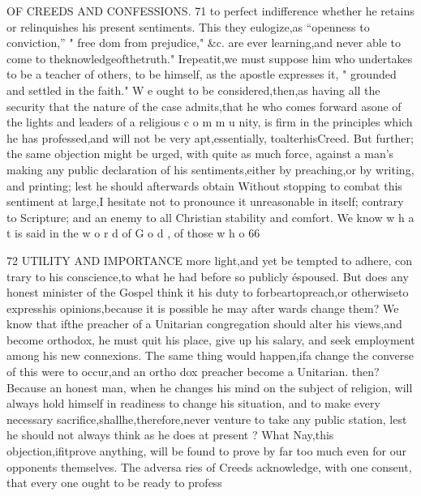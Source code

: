 \documentclass[
]{book}
\begin{document}
OF CREEDS AND CONFESSIONS. 71
to perfect indifference whether he retains or relinquishes his present sentiments. This they eulogize,as ``openness to conviction,'' " free
dom from prejudice," \&c.
are
ever learning,and never able to come to theknowledgeofthetruth." Irepeatit,we must suppose him who undertakes to be a teacher of others, to be himself, as the apostle expresses it, " grounded and settled in the faith." W e ought to be considered,then,as having all the security that the nature of the
case admits,that he who comes forward asone of the lights and leaders of a religious c o m m u nity, is firm in the principles which he has professed,and will not be very apt,essentially, toalterhisCreed.
But further; the same objection might be urged, with quite as much force, against a man's making any public declaration of his sentiments,either by preaching,or by writing, and printing; lest he should afterwards obtain
Without stopping to combat this sentiment at large,I hesitate
not to pronounce it unreasonable
in itself;
contrary to Scripture; and an enemy to all
Christian stability and comfort. We know w h a t is said in the w o r d of G o d , of those w h o
66

72
UTILITY AND IMPORTANCE
more light,and yet be tempted to adhere, con trary to his conscience,to what he had before
so publicly éspoused. But does any honest minister of the Gospel think it his duty to forbeartopreach,or otherwiseto expresshis
opinions,because it is possible he may after wards change them? We know that ifthe
preacher of a Unitarian congregation should alter his views,and become orthodox, he must quit his place, give up his salary, and seek employment among his new connexions.
The same thing would happen,ifa change the converse of this were to occur,and an ortho
dox preacher become a Unitarian.
then? Because an honest man, when he changes his mind on the subject of religion,
will always hold himself in readiness to change his situation, and to make every necessary
sacrifice,shallhe,therefore,never venture to take any public station, lest he should not always think as he does at present ?
What
Nay,this objection,ifitprove anything,
will be found to prove by far too much even for our opponents themselves. The adversa ries of Creeds acknowledge, with one consent,
that every one ought to be ready to profess
\end{document}
